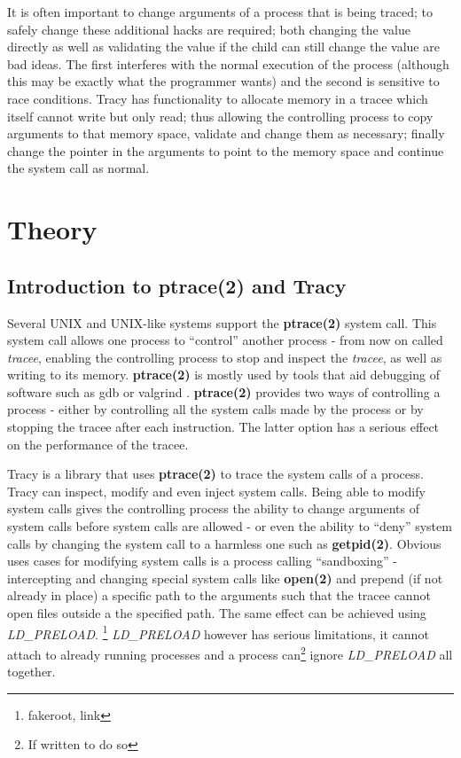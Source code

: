 \documentclass[a4paper, twoside, 10pt, twocolumn]{report}
\begin{document}
It is often important to change arguments of a process that is being traced; to
safely change these additional hacks are required; both changing the value
directly as well as validating the value if the child can still change the value
are bad ideas. The first interferes with the normal execution of the process
(although this may be exactly what the programmer wants) and the second is
sensitive to race conditions. Tracy has functionality to allocate memory in a
tracee which itself cannot write but only read; thus allowing the controlling
process to copy arguments to that memory space, validate and change them as
necessary; finally change the pointer in the arguments to point to the memory
space and continue the system call as normal.

\chapter{Theory}

\section{Introduction to ptrace(2) and Tracy}

Several UNIX and UNIX-like systems support the \textbf{ptrace(2)} system call.
This system call allows one process to ``control'' another process - from now on
called \textit{tracee}, enabling the controlling process to stop and inspect
the \textit{tracee}, as well as writing to its memory. \textbf{ptrace(2)} is
mostly used by tools that aid debugging of software such as gdb\cite{} or
valgrind \cite{}. \textbf{ptrace(2)} provides two ways of controlling a process
- either by controlling all the system calls made by the process or by stopping
the tracee after each instruction. The latter option has a serious effect on the
performance of the tracee.

Tracy is a library that uses \textbf{ptrace(2)} to trace the system calls of a
process. Tracy can inspect, modify and even inject system calls. Being able to
modify system calls gives the controlling process the ability to change
arguments of system calls before system calls are allowed - or even the ability
to ``deny'' system calls by changing the system call to a harmless one such as
\textbf{getpid(2)}. Obvious uses cases for modifying system calls is a process
calling ``sandboxing'' - intercepting and changing special system calls like
\textbf{open(2)} and prepend (if not already in place) a specific path to the
arguments such that the tracee cannot open files outside a the specified path.
The same effect can be achieved using \textit{LD\_PRELOAD}. \footnote{fakeroot,
link} \textit{LD\_PRELOAD} however has serious limitations, it cannot attach to
already running processes and a process can\footnote{If written to do so} ignore
\textit{LD\_PRELOAD} all together.
\end{document}
